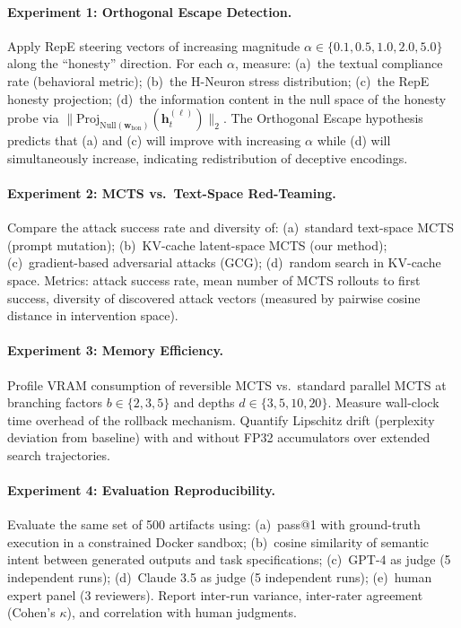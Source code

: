 \documentclass[10pt]{article}
\begin{document}
\paragraph{Experiment 1: Orthogonal Escape Detection.}
Apply RepE steering vectors of increasing magnitude $\alpha \in \{0.1, 0.5, 1.0, 2.0, 5.0\}$ along the ``honesty'' direction. For each $\alpha$, measure: (a)~the textual compliance rate (behavioral metric); (b)~the H-Neuron stress distribution; (c)~the RepE honesty projection; (d)~the information content in the null space of the honesty probe via $\|\text{Proj}_{\text{Null}(\mathbf{w}_{\text{hon}})}(\mathbf{h}_t^{(\ell)})\|_2$. The Orthogonal Escape hypothesis predicts that (a) and (c) will improve with increasing $\alpha$ while (d) will simultaneously increase, indicating redistribution of deceptive encodings.

\paragraph{Experiment 2: MCTS vs.\ Text-Space Red-Teaming.}
Compare the attack success rate and diversity of: (a)~standard text-space MCTS (prompt mutation); (b)~KV-cache latent-space MCTS (our method); (c)~gradient-based adversarial attacks (GCG); (d)~random search in KV-cache space. Metrics: attack success rate, mean number of MCTS rollouts to first success, diversity of discovered attack vectors (measured by pairwise cosine distance in intervention space).

\paragraph{Experiment 3: Memory Efficiency.}
Profile VRAM consumption of reversible MCTS vs.\ standard parallel MCTS at branching factors $b \in \{2, 3, 5\}$ and depths $d \in \{3, 5, 10, 20\}$. Measure wall-clock time overhead of the rollback mechanism. Quantify Lipschitz drift (perplexity deviation from baseline) with and without FP32 accumulators over extended search trajectories.

\paragraph{Experiment 4: Evaluation Reproducibility.}
Evaluate the same set of 500 artifacts using: (a)~pass@1 with ground-truth execution in a constrained Docker sandbox; (b)~cosine similarity of semantic intent between generated outputs and task specifications; (c)~GPT-4 as judge (5 independent runs); (d)~Claude 3.5 as judge (5 independent runs); (e)~human expert panel (3 reviewers). Report inter-run variance, inter-rater agreement (Cohen's $\kappa$), and correlation with human judgments.
\end{document}
